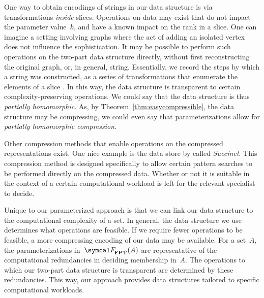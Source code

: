 One way to obtain encodings of strings in our data structure is via transformations \emph{inside} slices.
Operations on data may exist that do not impact the parameter value~$k$, and have a known impact on the rank in a slice.
One can imagine a setting involving graphs where the act of adding an isolated vertex does not influence the sophistication.
It may be possible to perform such operations on the two-part data structure directly, without first reconstructing the original graph, or, in general, string.
Essentially, we record the steps by which a string was constructed, as a series of transformations that enumerate the elements of a slice \parencite[see also][Theorem~4.2]{hemachandra1991sets}.
In this way, the data structure is transparent to certain complexity-preserving operations.
We could say that the data structure is thus \emph{partially homomorphic}.
As, by Theorem~\ref{thm:easycompressible}, the data structure may be compressing, we could even say that parameterizations allow for \emph{partially homomorphic compression}.

Other compression methods that enable operations on the compressed representations exist.
One nice example is the data store by \textcite{agarwal2015succinct} called \emph{Succinct}.
This compression method is designed specifically to allow certain pattern searches to be performed directly on the compressed data.
Whether or not it is suitable in the context of a certain computational workload is left for the relevant specialist to decide.

Unique to our parameterized approach is that we can link our data structure to the computational complexity of a set.
In general, the data structure we use determines what operations are feasible.
If we require fewer operations to be feasible, a more compressing encoding of our data may be available.
For a set~$A$, the parameterizations in~$\calF_\cl{FPT}(A)$ are representative of the computational redundancies in deciding membership in~$A$.
The operations to which our two-part data structure is transparent are determined by these redundancies.
This way, our approach provides data structures tailored  to specific computational workloads.
